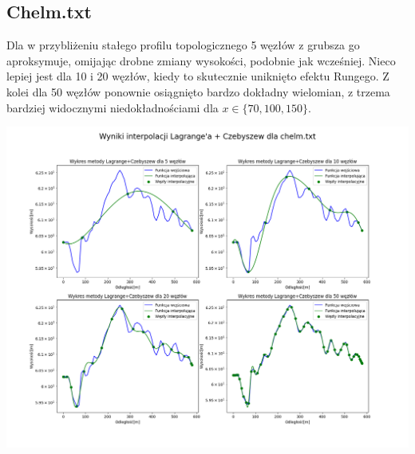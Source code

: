 \documentclass[a4paper,12pt]{article}
\begin{document}
	\subsection{Chelm.txt}
	Dla w przybliżeniu stałego profilu topologicznego 5 węzłów z grubsza go aproksymuje, omijając drobne zmiany wysokości, podobnie jak wcześniej. Nieco lepiej jest dla 10 i 20 węzłów, kiedy to skutecznie uniknięto efektu Rungego. Z kolei dla 50 węzłów ponownie osiągnięto bardzo dokładny wielomian, z trzema bardziej widocznymi niedokładnościami dla $x \in \{70, 100, 150\}$.
	\begin{center}
        \includegraphics[scale=0.4]{../charts/chebyshev_chelm.png}
    \end{center}
    
    \newpage
\end{document}
